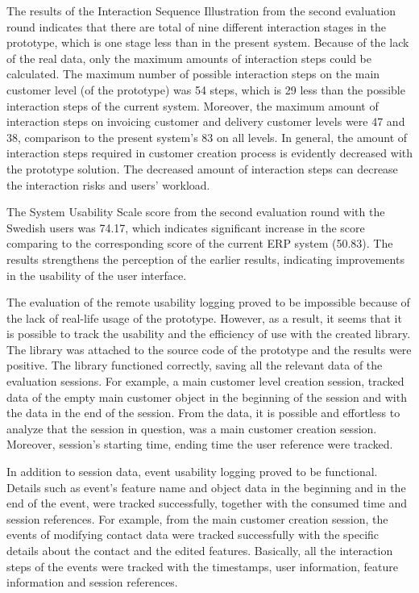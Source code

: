 \documentclass[12pt,a4paper,oneside,pdftex]{report}
\begin{document}
The results of the Interaction Sequence Illustration from the second evaluation round indicates that there are total of nine different interaction stages in the prototype, which is one stage less than in the present system. Because of the lack of the real data, only the maximum amounts of interaction steps could be calculated. The maximum number of possible interaction steps on the main customer level (of the prototype) was 54 steps, which is  29 less than the possible interaction steps of the current system. Moreover, the maximum amount of interaction steps on invoicing customer and delivery customer levels were 47 and 38, comparison to the present system's 83 on all levels. In general, the amount of interaction steps required in customer creation process is evidently decreased with the prototype solution. The decreased amount of interaction steps can decrease the interaction risks and users' workload.

The System Usability Scale score from the second evaluation round with the Swedish users was 74.17, which indicates significant increase in the score comparing to the corresponding score of the current ERP system (50.83). The results strengthens the perception of the earlier results, indicating improvements in the usability of the user interface. 
 
The evaluation of the remote usability logging proved to be impossible because of the lack of real-life usage of the prototype. However, as a result, it seems that it is possible to track the usability and the efficiency of use with the created library. The library was attached to the source code of the prototype and the results were positive. The library functioned correctly, saving all the relevant data of the evaluation sessions. For example, a main customer level creation session, tracked data of the empty main customer object in the beginning of the session and with the data in the end of the session. From the data, it is possible and effortless to analyze that the session in question, was a main customer creation session. Moreover, session's starting time, ending time the user reference were tracked. 

In addition to session data, event usability logging proved to be functional. Details such as event's feature name and object data in the beginning and in the end of the event, were tracked successfully, together with the consumed time and session references. For example, from the main customer creation session, the events of modifying contact data were tracked successfully with the specific details about the contact and the edited features. Basically, all the interaction steps of the events were tracked with the timestamps, user information, feature information and session references.
\end{document}
